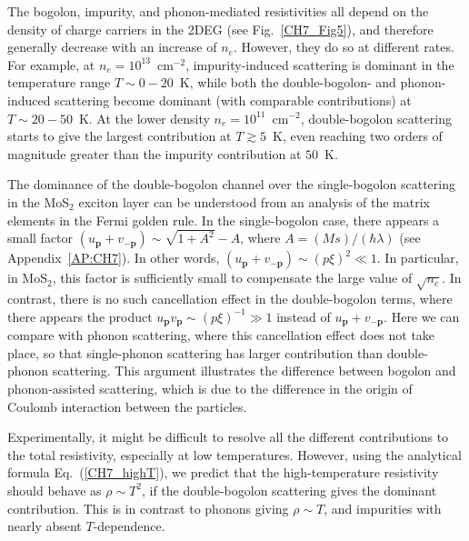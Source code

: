 The bogolon, impurity, and phonon-mediated resistivities all depend on the density of charge carriers in the 2DEG (see Fig.~\ref{CH7_Fig5}), and therefore generally decrease with an increase of $n_e$.
However, they do so at different rates.
For example, at $n_e=10^{13}$~cm$^{-2}$, impurity-induced scattering is dominant in the temperature range $T\sim 0-20$~K, while both the double-bogolon- and phonon-induced scattering become dominant (with comparable contributions) at $T\sim 20-50$~K.
At the lower density $n_e=10^{11}$~cm$^{-2}$, double-bogolon scattering starts to give the largest contribution at $T\gtrsim 5$~K, even reaching two orders of magnitude greater than the impurity contribution at $50$~K.

The dominance of the double-bogolon channel over the single-bogolon scattering in the MoS$_2$ exciton layer can be understood from an analysis of the matrix elements in the Fermi golden rule.
In the single-bogolon case, there appears a small factor $(u_\mathbf{p}+v_{-\mathbf{p}})\sim\sqrt{1+A^2}-A$, where $A=(Ms)/(\hbar \lambda)$ (see Appendix~\ref{AP:CH7}).
In other words, $(u_\mathbf{p}+v_{-\mathbf{p}})\sim(p\xi)^2\ll 1$.
In particular, in MoS$_2$, this factor is sufficiently small to compensate the large value of $\sqrt{n_c}$.
In contrast, there is no such cancellation effect in the double-bogolon terms, where there appears the product $u_\textbf{p}v_\textbf{p}\sim (p\xi)^{-1}\gg 1$ instead of $u_\mathbf{p}+v_{-\mathbf{p}}$.
Here we can compare with phonon scattering, where this cancellation effect does not take place, so that single-phonon scattering has larger contribution than double-phonon scattering.
This argument illustrates the difference between bogolon and phonon-assisted scattering, which is due to the difference in the origin of Coulomb interaction between the particles.

Experimentally, it might be difficult to resolve all the different contributions to the total resistivity, especially at low temperatures.
However, using the analytical formula Eq.~(\ref{CH7_highT}), we predict that the high-temperature resistivity should behave as $\rho\sim T^2$, if the double-bogolon scattering gives the dominant contribution.
This is in contrast to phonons giving $\rho\sim T$, and impurities with nearly absent $T$-dependence.

